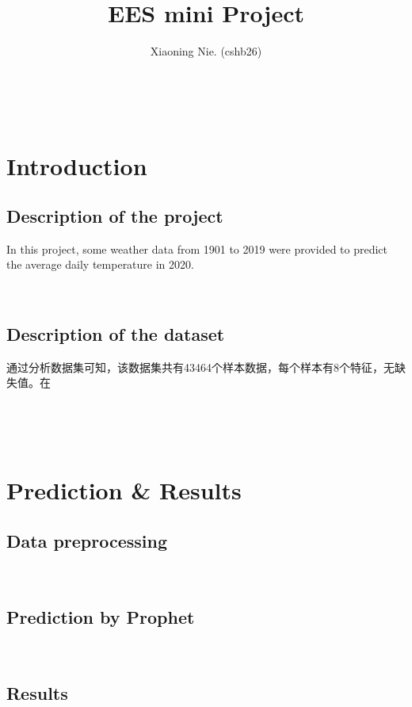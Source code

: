 \documentclass{article}
\title{EES mini Project}
\author{Xiaoning Nie. (cshb26)}
\begin{document}
\maketitle

\ 

\section{Introduction}

\subsection{Description of the project}

In this project, some weather data from 1901 to 2019 were provided to predict the average daily temperature in 2020.





\ 

\subsection{Description of the dataset}

通过分析数据集可知，该数据集共有43464个样本数据，每个样本有8个特征，无缺失值。在



\ 

\

\section{Prediction \& Results}

\subsection{Data preprocessing}







\ 


\subsection{Prediction by Prophet}






\ 



\subsection{Results}
\end{document}
